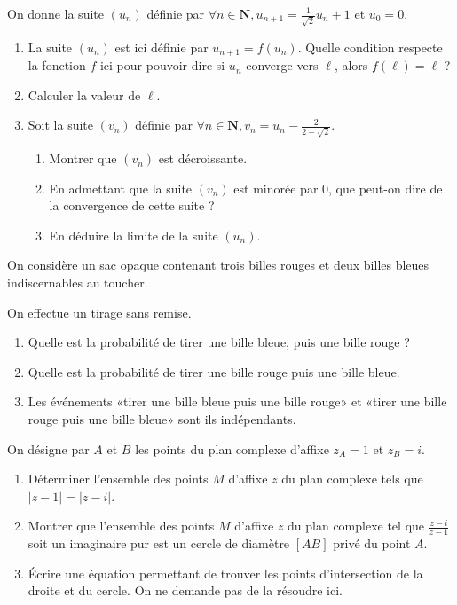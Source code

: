 \begin{question}[topic=suites]
On donne la suite $(u_n)$ définie par $\forall n\in \mathbf{N},
u_{n+1} = \frac{1}{\sqrt{2}}u_{n} + 1$ et $u_0 = 0$.
\begin{enumerate}
  \item La suite $(u_n)$ est ici définie par $u_{n+1} = f(u_n)$. Quelle
    condition respecte la fonction $f$ ici pour pouvoir dire si $u_n$
    converge vers $\ell$, alors $f(\ell) = \ell$ ?
  \item Calculer la valeur de $\ell$.
  \item Soit la suite $(v_n)$ définie par $\forall n\in \mathbf{N}, v_n
    = u_n - \frac{2}{2 - \sqrt{2}}$.
    \begin{enumerate}
      \item Montrer que $(v_n)$ est décroissante.
      \item En admettant que la suite $(v_n)$ est minorée par 0, que
        peut-on dire de la convergence de cette suite ?
      \item En déduire la limite de la suite $(u_n)$.
    \end{enumerate}
\end{enumerate}
\end{question}

\begin{question}[topic=probabilités]
On considère un sac opaque contenant trois billes rouges et deux billes
bleues indiscernables au toucher.

On effectue un tirage sans remise.

\begin{enumerate}
  \item Quelle est la probabilité de tirer une bille bleue, puis une
    bille rouge ?
  \item Quelle est la probabilité de tirer une bille rouge puis une
    bille bleue.
  \item Les événements «tirer une bille bleue puis une bille rouge» et
    «tirer une bille rouge puis une bille bleue» sont ils indépendants.
\end{enumerate}
\end{question}

\begin{question}[topic=complexes]
On désigne par $A$ et $B$ les points du plan complexe d'affixe $z_A = 1$
et $z_B = i$.
\begin{enumerate}
  \item Déterminer l'ensemble des points $M$ d'affixe $z$ du plan
    complexe tels que $\left\lvert z - 1 \right\rvert = \left\lvert z -
    i \right\rvert$.
  \item Montrer que l'ensemble des points $M$ d'affixe $z$ du plan
    complexe tel que $\frac{z - i}{z -1}$ soit un imaginaire pur est un
    cercle de diamètre $[AB]$ privé du point $A$.
  \item Écrire une équation permettant de trouver les points
    d'intersection de la droite et du cercle. On ne demande pas de la
    résoudre ici.
\end{enumerate}
\end{question}

